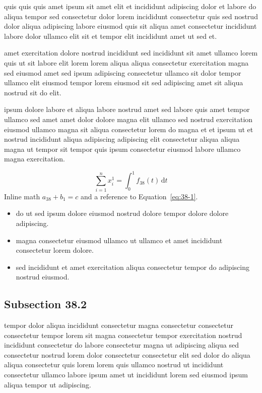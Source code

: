 \documentclass{article}
\begin{document}
quis quis quis amet ipsum sit amet elit et incididunt adipiscing dolor et labore do aliqua tempor sed consectetur dolor lorem incididunt consectetur quis sed nostrud dolor aliqua adipiscing labore eiusmod quis sit aliqua amet consectetur incididunt labore dolor ullamco elit sit et tempor elit incididunt amet ut sed et.

amet exercitation dolore nostrud incididunt sed incididunt sit amet ullamco lorem quis ut sit labore elit lorem lorem aliqua aliqua consectetur exercitation magna sed eiusmod amet sed ipsum adipiscing consectetur ullamco sit dolor tempor ullamco elit eiusmod tempor lorem eiusmod sit sed adipiscing amet sit aliqua nostrud sit do elit.

ipsum dolore labore et aliqua labore nostrud amet sed labore quis amet tempor ullamco sed amet amet dolor dolore magna elit ullamco sed nostrud exercitation eiusmod ullamco magna sit aliqua consectetur lorem do magna et et ipsum ut et nostrud incididunt aliqua adipiscing adipiscing elit consectetur aliqua aliqua magna ut tempor sit tempor quis ipsum consectetur eiusmod labore ullamco magna exercitation.

\begin{equation}\label{eq:38-1}
  \sum_{i=1}^{n} x_i^{1} = \int_0^1 f_{38}(t)\,\mathrm{d}t
\end{equation}
Inline math $a_{38} + b_{1} = c$ and a reference to Equation~\eqref{eq:38-1}.

\begin{itemize}
  \item do ut sed ipsum dolore eiusmod nostrud dolore tempor dolore dolore adipiscing.
  \item magna consectetur eiusmod ullamco ut ullamco et amet incididunt consectetur lorem dolore.
  \item sed incididunt et amet exercitation aliqua consectetur tempor do adipiscing nostrud eiusmod.
\end{itemize}

\subsection{Subsection 38.2}\label{sec:38-2}
tempor dolor aliqua incididunt consectetur magna consectetur consectetur consectetur tempor lorem sit magna consectetur tempor exercitation nostrud incididunt consectetur do labore consectetur magna ut adipiscing aliqua sed consectetur nostrud lorem dolor consectetur consectetur elit sed dolor do aliqua aliqua consectetur quis lorem lorem quis ullamco nostrud ut incididunt consectetur ullamco labore ipsum amet ut incididunt lorem sed eiusmod ipsum aliqua tempor ut adipiscing.
\end{document}
